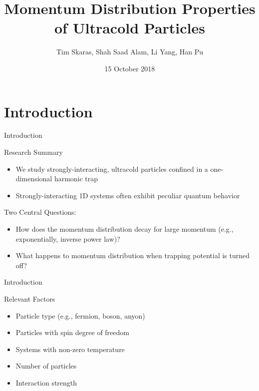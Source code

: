 \documentclass[12pt, usenames, dvipsnames]{beamer}
\title{Momentum Distribution Properties of Ultracold Particles}
\author{Tim Skaras, Shah Saad Alam, Li Yang, Han Pu}
\institute{\small Rice University}
\date{15 October 2018}
\begin{document}

\begin{frame}
  \titlepage

\end{frame}


\section{Introduction}


\begin{frame}[t]{Introduction}

\begin{block}{Research Summary}
\begin{itemize}
	\item We study strongly-interacting, ultracold particles confined in a one-dimensional harmonic trap
	\item Strongly-interacting 1D systems often exhibit peculiar quantum behavior
\end{itemize}
\end{block}

\begin{block}{Two Central Questions:}
\begin{itemize}
	\item How does the momentum distribution decay for large momentum (e.g., exponentially, inverse power law)?
	\item What happens to momentum distribution when trapping potential is turned off?
\end{itemize}
\end{block}

\end{frame}


\begin{frame}[t]{Introduction}

\begin{block}{Relevant Factors}

\begin{itemize}
	\item Particle type (e.g., fermion, boson, anyon)
	\item Particles with spin degree of freedom
	\item Systems with non-zero temperature
	\item Number of particles
	\item Interaction strength
\end{itemize}

\end{block}

\end{frame}
\end{document}
